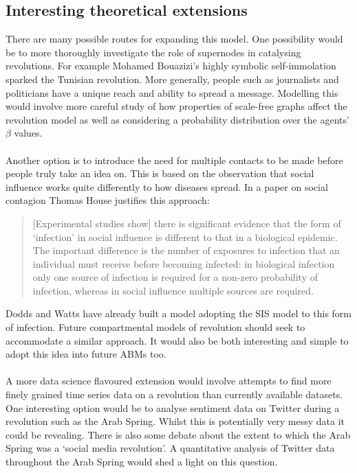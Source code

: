 \subsection{Interesting theoretical extensions}
There are many possible routes for expanding this model. One possibility would be to more thoroughly investigate the role of supernodes in catalysing revolutions. For example Mohamed Bouazizi's highly symbolic self-immolation sparked the Tunisian revolution. More generally, people such as journalists and politicians have a unique reach and ability to spread a message. Modelling this would involve more careful study of how properties of scale-free graphs affect the revolution model as well as considering a probability distribution over the agents' $\beta$ values.\\
\\
Another option is to introduce the need for multiple contacts to be made before people truly take an idea on. This is based on the observation that social influence works quite differently to how diseases spread. In a paper on social contagion Thomas House justifies this approach\cite{thomas-house}:
\begin{quote}
[Experimental studies show] there is significant evidence that the form of ‘infection’ in social influence is different to that in a biological epidemic. The important difference is the number of exposures to infection that an individual must receive before becoming infected: in biological infection only one source of infection is required for a non-zero probability of infection, whereas in social influence multiple sources are required.
\end{quote}
Dodds and Watts have already built a model adopting the SIS model to this form of infection\cite{dodds-watts}. Future compartmental models of revolution should seek to accommodate a similar approach. It would also be both interesting and simple to adopt this idea into future ABMs too.\\
\\
A more data science flavoured extension would involve attempts to find more finely grained time series data on a revolution than currently available datasets\cite{NAVCO-2.0}. One interesting option would be to analyse sentiment data on Twitter during a revolution such as the Arab Spring. Whilst this is potentially very messy data it could be revealing. There is also some debate about the extent to which the Arab Spring was a `social media revolution'\cite{egypt-five-years}. A quantitative analysis of Twitter data throughout the Arab Spring would shed a light on this question.

